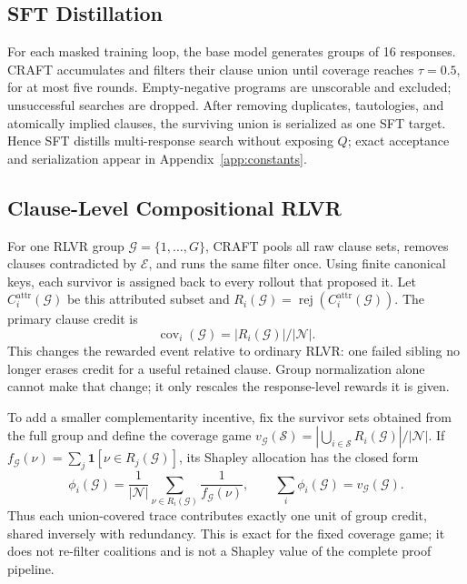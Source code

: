 \subsection{SFT Distillation}\label{sec:method:sft}

For each masked training loop, the base model generates groups of 16
responses.  CRAFT accumulates and filters their clause union until coverage
reaches \(\tau=0.5\), for at most five rounds.  Empty-negative programs are
unscorable and excluded; unsuccessful searches are dropped.  After removing
duplicates, tautologies, and atomically implied clauses, the surviving union
is serialized as one SFT target.  Hence SFT distills multi-response search
without exposing \(Q\); exact acceptance and serialization appear in
Appendix~\ref{app:constants}.

\subsection{Clause-Level Compositional RLVR}\label{sec:method:reward}

For one RLVR group \(\mathcal G=\{1,\ldots,G\}\), CRAFT pools all raw clause
sets, removes clauses contradicted by \(\mathcal E\), and runs the same filter
once.  Using finite canonical keys, each survivor is assigned back to every
rollout that proposed it.  Let \(C_i^{\mathrm{attr}}(\mathcal G)\) be this
attributed subset and
\(R_i(\mathcal G)=\operatorname{rej}(C_i^{\mathrm{attr}}(\mathcal G))\).
The primary clause credit is
\[
 \operatorname{cov}_i(\mathcal G)=|R_i(\mathcal G)|/|\mathcal N|.
\]
This changes the rewarded event relative to ordinary RLVR: one failed sibling
no longer erases credit for a useful retained clause.  Group normalization
alone cannot make that change; it only rescales the response-level rewards it
is given.

To add a smaller complementarity incentive, fix the survivor sets obtained
from the full group and define the coverage game
\(v_{\mathcal G}(\mathcal S)=|\bigcup_{i\in\mathcal S}R_i(\mathcal G)|/
|\mathcal N|\).  If
\(f_{\mathcal G}(\nu)=\sum_j\mathbf1[\nu\in R_j(\mathcal G)]\), its Shapley
allocation has the closed form
\begin{equation}\label{eq:shapley-credit}
 \phi_i(\mathcal G)=\frac{1}{|\mathcal N|}
 \sum_{\nu\in R_i(\mathcal G)}\frac{1}{f_{\mathcal G}(\nu)},\qquad
 \sum_i\phi_i(\mathcal G)=v_{\mathcal G}(\mathcal G).
\end{equation}
Thus each union-covered trace contributes exactly one unit of group credit,
shared inversely with redundancy.  This is exact for the fixed coverage game;
it does not re-filter coalitions and is not a Shapley value of the complete
proof pipeline.

